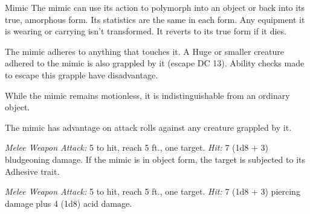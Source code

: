 \documentclass[10pt,a4paper,twoside,bg=print,twocolumn,openany,nodeprecatedcode]{dndbook}
\begin{document}
\begin{DndMonster}[float=t]{Mimic}
\DndMonsterBasics[
armor-class = {12 (natural armor)},
hit-points = {\DndDice{9d8 + 18}},
speed = {15 ft.}
]
\DndMonsterAbilityScores[
 str = 17,
 dex = 12,
 con = 15,
 int = 5,
 wis = 13,
 cha = 8
]
\DndMonsterDetails[
skills = {Stealth +5},
damage-immunities = {acid},
condition-immunities = {prone},
senses = {darkvision 60 ft., passive perception 11},
challenge = 2,
]
The mimic can use its action to polymorph into an object or back into its true, amorphous form. Its statistics are the same in each form. Any equipment it is wearing or carrying isn't transformed. It reverts to its true form if it dies.

The mimic adheres to anything that touches it. A Huge or smaller creature adhered to the mimic is also grappled by it (escape DC 13). Ability checks made to escape this grapple have disadvantage.

While the mimic remains motionless, it is indistinguishable from an ordinary object.

The mimic has advantage on attack rolls against any creature grappled by it.

\textsl{Melee Weapon Attack:} 5 to hit, reach 5 ft., one target. \textsl{Hit:} 7 (1d8 + 3) bludgeoning damage. If the mimic is in object form, the target is subjected to its Adhesive trait.

\textsl{Melee Weapon Attack:} 5 to hit, reach 5 ft., one target. \textsl{Hit:} 7 (1d8 + 3) piercing damage plus 4 (1d8) acid damage.

\end{DndMonster}
\end{document}
